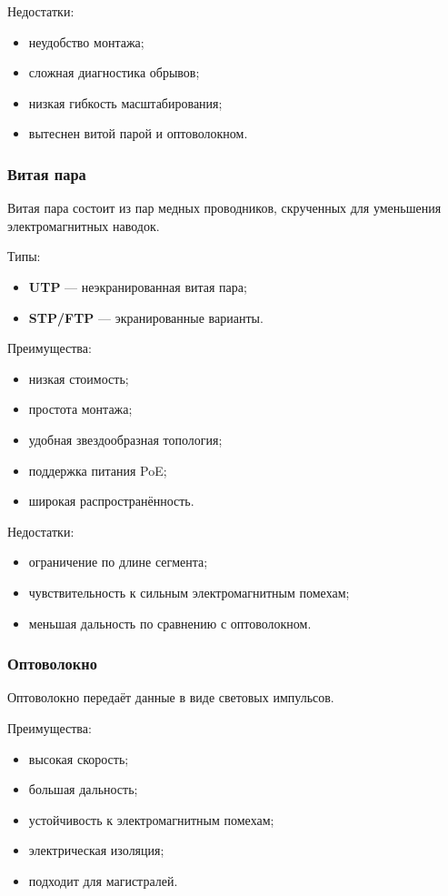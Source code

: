 \documentclass[12pt,a4paper]{article}
\begin{document}
Недостатки:
\begin{itemize}
    \item неудобство монтажа;
    \item сложная диагностика обрывов;
    \item низкая гибкость масштабирования;
    \item вытеснен витой парой и оптоволокном.
\end{itemize}

\subsubsection{Витая пара}

Витая пара состоит из пар медных проводников, скрученных для уменьшения электромагнитных наводок.

Типы:
\begin{itemize}
    \item \textbf{UTP} --- неэкранированная витая пара;
    \item \textbf{STP/FTP} --- экранированные варианты.
\end{itemize}

Преимущества:
\begin{itemize}
    \item низкая стоимость;
    \item простота монтажа;
    \item удобная звездообразная топология;
    \item поддержка питания PoE;
    \item широкая распространённость.
\end{itemize}

Недостатки:
\begin{itemize}
    \item ограничение по длине сегмента;
    \item чувствительность к сильным электромагнитным помехам;
    \item меньшая дальность по сравнению с оптоволокном.
\end{itemize}

\subsubsection{Оптоволокно}

Оптоволокно передаёт данные в виде световых импульсов.

Преимущества:
\begin{itemize}
    \item высокая скорость;
    \item большая дальность;
    \item устойчивость к электромагнитным помехам;
    \item электрическая изоляция;
    \item подходит для магистралей.
\end{itemize}
\end{document}
